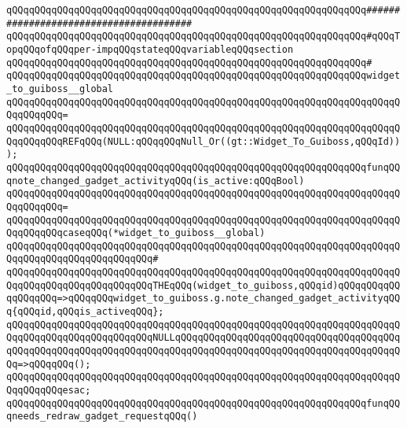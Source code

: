 \verb|qQQqqQQqqQQqqQQqqQQqqQQqqQQqqQQqqQQqqQQqqQQqqQQqqQQqqQQqqQQqqQQq#######################################|\newline
\verb|qQQqqQQqqQQqqQQqqQQqqQQqqQQqqQQqqQQqqQQqqQQqqQQqqQQqqQQqqQQqqQQq#qQQqTopqQQqofqQQqper-impqQQqstateqQQqvariableqQQqsection|\newline
\verb|qQQqqQQqqQQqqQQqqQQqqQQqqQQqqQQqqQQqqQQqqQQqqQQqqQQqqQQqqQQqqQQq#|\newline
\newline
\verb|qQQqqQQqqQQqqQQqqQQqqQQqqQQqqQQqqQQqqQQqqQQqqQQqqQQqqQQqqQQqqQQqwidget_to_guiboss__global|\newline
\verb|qQQqqQQqqQQqqQQqqQQqqQQqqQQqqQQqqQQqqQQqqQQqqQQqqQQqqQQqqQQqqQQqqQQqqQQqqQQqqQQq=|\newline
\verb|qQQqqQQqqQQqqQQqqQQqqQQqqQQqqQQqqQQqqQQqqQQqqQQqqQQqqQQqqQQqqQQqqQQqqQQqqQQqqQQqREFqQQq(NULL:qQQqqQQqNull_Or((gt::Widget_To_Guiboss,qQQqId)));|\newline
\newline
\verb|qQQqqQQqqQQqqQQqqQQqqQQqqQQqqQQqqQQqqQQqqQQqqQQqqQQqqQQqqQQqqQQqfunqQQqnote_changed_gadget_activityqQQq(is_active:qQQqBool)|\newline
\verb|qQQqqQQqqQQqqQQqqQQqqQQqqQQqqQQqqQQqqQQqqQQqqQQqqQQqqQQqqQQqqQQqqQQqqQQqqQQqqQQq=|\newline
\verb|qQQqqQQqqQQqqQQqqQQqqQQqqQQqqQQqqQQqqQQqqQQqqQQqqQQqqQQqqQQqqQQqqQQqqQQqqQQqqQQqcaseqQQq(*widget_to_guiboss__global)|\newline
\verb|qQQqqQQqqQQqqQQqqQQqqQQqqQQqqQQqqQQqqQQqqQQqqQQqqQQqqQQqqQQqqQQqqQQqqQQqqQQqqQQqqQQqqQQqqQQqqQQq#|\newline
\verb|qQQqqQQqqQQqqQQqqQQqqQQqqQQqqQQqqQQqqQQqqQQqqQQqqQQqqQQqqQQqqQQqqQQqqQQqqQQqqQQqqQQqqQQqqQQqqQQqTHEqQQq(widget_to_guiboss,qQQqid)qQQqqQQqqQQqqQQqqQQq=>qQQqqQQqwidget_to_guiboss.g.note_changed_gadget_activityqQQq{qQQqid,qQQqis_activeqQQq};|\newline
\verb|qQQqqQQqqQQqqQQqqQQqqQQqqQQqqQQqqQQqqQQqqQQqqQQqqQQqqQQqqQQqqQQqqQQqqQQqqQQqqQQqqQQqqQQqqQQqqQQqNULLqQQqqQQqqQQqqQQqqQQqqQQqqQQqqQQqqQQqqQQqqQQqqQQqqQQqqQQqqQQqqQQqqQQqqQQqqQQqqQQqqQQqqQQqqQQqqQQqqQQqqQQqqQQqqQQq=>qQQqqQQq();|\newline
\verb|qQQqqQQqqQQqqQQqqQQqqQQqqQQqqQQqqQQqqQQqqQQqqQQqqQQqqQQqqQQqqQQqqQQqqQQqqQQqqQQqesac;|\newline
\newline
\verb|qQQqqQQqqQQqqQQqqQQqqQQqqQQqqQQqqQQqqQQqqQQqqQQqqQQqqQQqqQQqqQQqfunqQQqneeds_redraw_gadget_requestqQQq()|\newline
